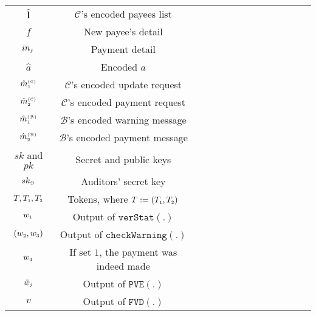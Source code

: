\begin{table}[!htbp]
\begin{scriptsize}
\begin{center}
{{\begin{tabular}{|c|c|c|c|c|c|c|c|c|c|c|c|c|c|}
\cellcolor{gray!20}\scriptsize$\hat{\bm{l}}$ &\cellcolor{gray!20}\scriptsize  $\mathcal{C}$'s encoded payees list\\ 
%              
\cellcolor{white!20}\scriptsize$f$ &\cellcolor{white!20}\scriptsize New payee’s detail  \\ 
\cellcolor{gray!20}\scriptsize$in_{\scriptscriptstyle f}$ &\cellcolor{gray!20}\scriptsize Payment detail \\ 
%
  \cellcolor{white!20}\scriptsize$\hat a$ &\cellcolor{white!20}\scriptsize Encoded $a$ \\     
%
\cellcolor{gray!20}\scriptsize$\hat {m}^{\scriptscriptstyle(\mathcal{C})}_{\scriptscriptstyle 1}$ &\cellcolor{gray!20}\scriptsize $\mathcal{C}$'s encoded update request\\     
%
\cellcolor{white!20}\scriptsize$\hat {m}^{\scriptscriptstyle(\mathcal{C})}_{\scriptscriptstyle 2}$ &\cellcolor{white!20}\scriptsize $\mathcal{C}$'s encoded payment request\\     
%      
\cellcolor{gray!20}\scriptsize$\hat {m}^{\scriptscriptstyle(\mathcal{B})}_{\scriptscriptstyle 1}$ &\cellcolor{gray!20}\scriptsize $\mathcal{B}$'s encoded warning message\\     
%
\cellcolor{white!20}\scriptsize$\hat {m}^{\scriptscriptstyle(\mathcal{B})}_{\scriptscriptstyle 2}$ &\cellcolor{white!20}\scriptsize $\mathcal{B}$'s encoded payment message\\     
%          
     \cellcolor{gray!20}\scriptsize$sk$ and $pk$ &\cellcolor{gray!20}\scriptsize Secret  and public keys\\     
%
   \cellcolor{white!20}\scriptsize$sk_{\scriptscriptstyle\mathcal{D}}$ &\cellcolor{white!20}\scriptsize Auditors' secret key\\     
%
\cellcolor{gray!20}\scriptsize$T, T_{\scriptscriptstyle 1},T_{\scriptscriptstyle 2}$ &\cellcolor{gray!20}\scriptsize  Tokens, where  $T:=( T_{\scriptscriptstyle 1},T_{\scriptscriptstyle 2})$\\ 
%
\cellcolor{white!20}\scriptsize$w_{\scriptscriptstyle 1}$ &\cellcolor{white!20}\scriptsize  Output of $\mathtt{verStat}(.)$\\ 
%
\cellcolor{gray!20}\scriptsize$(w_{\scriptscriptstyle 2},w_{\scriptscriptstyle 3})$ &\cellcolor{gray!20}\scriptsize  Output of $\mathtt{checkWarning}(.)$\\ 
%
\cellcolor{white!20}\scriptsize$w_{\scriptscriptstyle 4}$ &\cellcolor{white!20}\scriptsize  If set $1$, the payment was indeed made\\ 
%
\cellcolor{white!20}\scriptsize$\bar{w}_{\scriptscriptstyle j}$ &\cellcolor{white!20}\scriptsize  Output of $\mathtt{PVE}(.)$\\ 
%
\cellcolor{gray!20}\scriptsize$v$ &\cellcolor{gray!20}\scriptsize  Output of $\mathtt{FVD}(.)$\\ 

\end{tabular}}}
\end{center}
\end{scriptsize}
\end{table}
